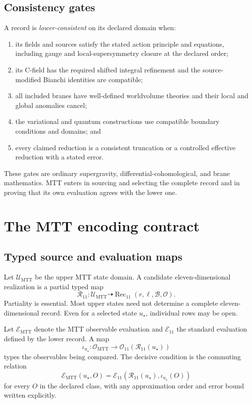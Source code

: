\documentclass[11pt]{article}
\theoremstyle{definition}
\theoremstyle{remark}
\newcommand{\cB}{\mathcal B}
\newcommand{\cE}{\mathcal E}
\newcommand{\cO}{\mathcal O}
\newcommand{\cR}{\mathcal R}
\newcommand{\cU}{\mathcal U}
\begin{document}
\subsection{Consistency gates}

A record is \emph{lower-consistent} on its declared domain when:
\begin{enumerate}[leftmargin=1.7em]
\item its fields and sources satisfy the stated action principle and
      equations, including gauge and local-supersymmetry closure at the
      declared order;
\item its C-field has the required shifted integral refinement and the
      source-modified Bianchi identities are compatible;
\item all included branes have well-defined worldvolume theories and their
      local and global anomalies cancel;
\item the variational and quantum constructions use compatible boundary
      conditions and domains; and
\item every claimed reduction is a consistent truncation or a controlled
      effective reduction with a stated error.
\end{enumerate}

These gates are ordinary supergravity, differential-cohomological, and brane
mathematics.  MTT enters in sourcing and selecting the complete record and in
proving that its own evaluation agrees with the lower one.

\section{The MTT encoding contract}
\label{sec:map}

\subsection{Typed source and evaluation maps}

Let \(\cU_{\mathrm{MTT}}\) be the upper MTT state domain.  A candidate
eleven-dimensional realization is a partial typed map
\[
\cR_{11}:\cU_{\mathrm{MTT}}
\dashrightarrow
\operatorname{Rec}_{11}(r,\ell,\cB,\cO).
\]
Partiality is essential.  Most upper states need not determine a complete
eleven-dimensional record.  Even for a selected state \(u_\star\), individual
rows may be open.

Let \(\cE_{\mathrm{MTT}}\) denote the MTT observable evaluation and
\(\cE_{11}\) the standard evaluation defined by the lower record.  A map
\[
\iota_{u_\star}:\cO_{\mathrm{MTT}}
\longrightarrow
\cO_{11}(\cR_{11}(u_\star))
\]
types the observables being compared.  The decisive condition is the
commuting relation
\begin{equation}
\cE_{\mathrm{MTT}}(u_\star,O)
=
\cE_{11}\!\left(\cR_{11}(u_\star),\iota_{u_\star}(O)\right)
\label{eq:factor}
\end{equation}
for every \(O\) in the declared class, with any approximation order and error
bound written explicitly.
\end{document}
